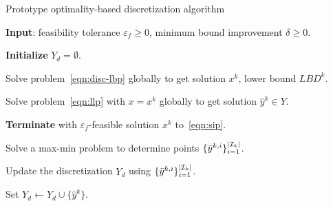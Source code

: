 \documentclass{article}
\DeclarePairedDelimiter\abs{\lvert}{\rvert}%
\newcommand{\I}{\mathcal{I}}
\newcommand{\1}[1]{\mathds{1}\left[#1\right]}
\begin{document}
\begin{algorithm}[t]
\caption{Prototype optimality-based discretization algorithm}
\label{alg:prototype_disc}
{
\begin{algorithmic}[1]
\State \textbf{Input}: feasibility tolerance $\varepsilon_{f} \geq 0$, minimum bound improvement $\delta \geq 0$.

\State \textbf{Initialize} $Y_d = \emptyset$.



\State Solve problem~\eqref{eqn:disc-lbp} globally to get solution $x^k$, lower bound $LBD^k$.

\State Solve problem~\eqref{eqn:llp} with $x = x^k$ globally to get solution $\hat{y}^k \in Y$.


\State \textbf{Terminate} with $\varepsilon_f$-feasible solution $x^k$ to~\eqref{eqn:sip}.

\Else

\State Solve a max-min problem to determine points $\{\bar{y}^{k,i}\}_{i=1}^{\abs{\I_k}}$.

\vspace*{0.03in}

\State Update the discretization $Y_d$ using $\{\bar{y}^{k,i}\}_{i=1}^{\abs{\I_k}}$.

\Else

\State Set $Y_d \leftarrow Y_d \cup \{ \hat{y}^k \}$.

\EndIf

\vspace*{0.03in}
\EndIf


\EndFor

\end{algorithmic}
}
\end{algorithm}
\end{document}

